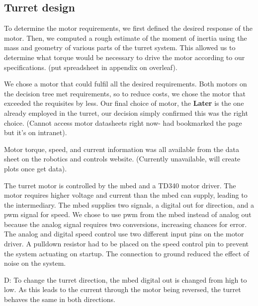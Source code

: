 ﻿\subsection{Turret design}

To determine the motor requirements, we first defined the desired response of the motor. Then, we computed a rough estimate of the moment of inertia using the mass and geometry of various parts of the turret system. This allowed us to determine what torque would be necessary to drive the motor according to our specifications. (put spreadsheet in appendix on overleaf).

We chose a motor that could fulfil all the desired requirements. Both motors on the decision tree met requirements, so to reduce costs, we chose the motor that exceeded the requisites by less. Our final choice of motor, the \textbf{Later} is the one already employed in the turret, our decision simply confirmed this was the right choice. (Cannot access motor datasheets right now- had bookmarked the page but it’s on intranet).

Motor torque, speed, and current information was all available from the data sheet on the robotics and controls website. (Currently unavailable, will create plots once get data).

The turret motor is controlled by the mbed and a TD340 motor driver. The motor requires higher voltage and current than the mbed can supply, leading to the intermediary. The mbed supplies two signals, a digital out for direction, and a pwm signal for speed. We chose to use pwm from the mbed instead of analog out because the analog signal requires two conversions, increasing chances for error. The analog and digital speed control use two different input pins on the motor driver. A pulldown resistor had to be placed on the speed control pin to prevent the system actuating on startup. The connection to ground reduced the effect of noise on the system.

D: To change the turret direction, the mbed digital out is changed from high to low. As this leads to the current through the motor being reversed, the turret behaves the same in both directions.